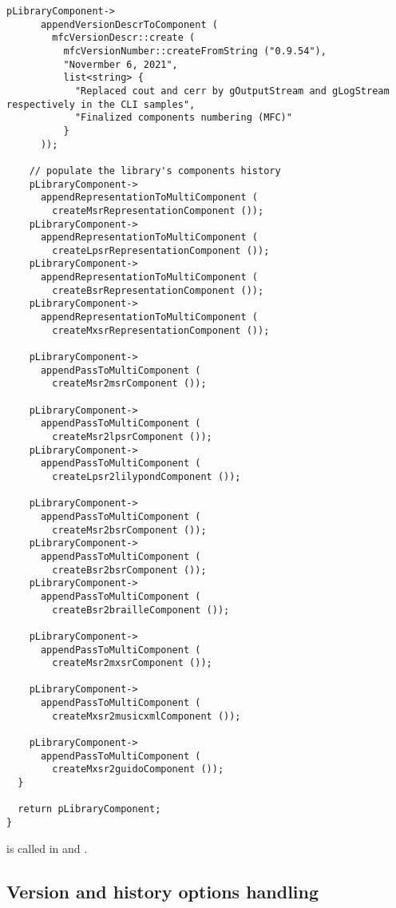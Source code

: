 \begin{lstlisting}[language=CPlusPlus]
    pLibraryComponent->
      appendVersionDescrToComponent (
        mfcVersionDescr::create (
          mfcVersionNumber::createFromString ("0.9.54"),
          "Novermber 6, 2021",
          list<string> {
            "Replaced cout and cerr by gOutputStream and gLogStream respectively in the CLI samples",
            "Finalized components numbering (MFC)"
          }
      ));

    // populate the library's components history
    pLibraryComponent->
      appendRepresentationToMultiComponent (
        createMsrRepresentationComponent ());
    pLibraryComponent->
      appendRepresentationToMultiComponent (
        createLpsrRepresentationComponent ());
    pLibraryComponent->
      appendRepresentationToMultiComponent (
        createBsrRepresentationComponent ());
    pLibraryComponent->
      appendRepresentationToMultiComponent (
        createMxsrRepresentationComponent ());

    pLibraryComponent->
      appendPassToMultiComponent (
        createMsr2msrComponent ());

    pLibraryComponent->
      appendPassToMultiComponent (
        createMsr2lpsrComponent ());
    pLibraryComponent->
      appendPassToMultiComponent (
        createLpsr2lilypondComponent ());

    pLibraryComponent->
      appendPassToMultiComponent (
        createMsr2bsrComponent ());
    pLibraryComponent->
      appendPassToMultiComponent (
        createBsr2bsrComponent ());
    pLibraryComponent->
      appendPassToMultiComponent (
        createBsr2brailleComponent ());

    pLibraryComponent->
      appendPassToMultiComponent (
        createMsr2mxsrComponent ());

    pLibraryComponent->
      appendPassToMultiComponent (
        createMxsr2musicxmlComponent ());

    pLibraryComponent->
      appendPassToMultiComponent (
        createMxsr2guidoComponent ());
  }

  return pLibraryComponent;
}
\end{lstlisting}

 is called in  and .


\subsection{Version and history options handling}\label{Version and history options handling}

